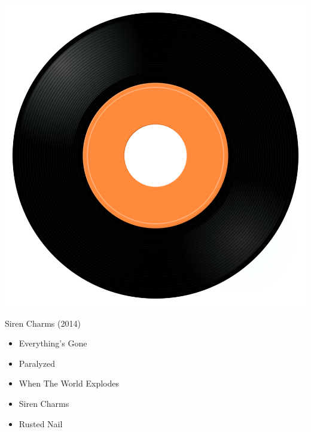 \begin{minipage}[t]{0.25\textwidth}\vspace{0pt}
\captionsetup{type=figure}
\includegraphics[width=\textwidth]{Images/cover.png}
\caption*{Siren Charms (2014)}
\end{minipage}
\begin{minipage}[t]{0.25\textwidth}\vspace{0pt}
\begin{itemize}[nosep,leftmargin=1em,labelwidth=*,align=left]
	\setlength{\itemsep}{0pt}
	\item Everything's Gone
	\item Paralyzed
	\item When The World Explodes
	\item Siren Charms
	\item Rusted Nail
\end{itemize}
\end{minipage}
